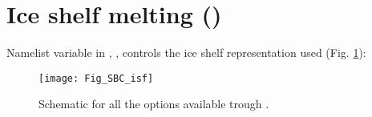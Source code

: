 \documentclass[NEMO_book]{subfiles}
\begin{document}
%



\section   [Ice shelf melting (\textit{sbcisf})]
                        {Ice shelf melting ()}
\label{SBC_isf}
Namelist variable in , , controls the ice shelf representation used (Fig. \ref{Fig_SBC_isf}): 

\begin{figure}[!h]    \begin{center}
\texttt{[image: Fig\_SBC\_isf]}
\caption{ \label{Fig_SBC_isf}
Schematic for all the options available trough .}
\end{center}   \end{figure}
\end{document}
